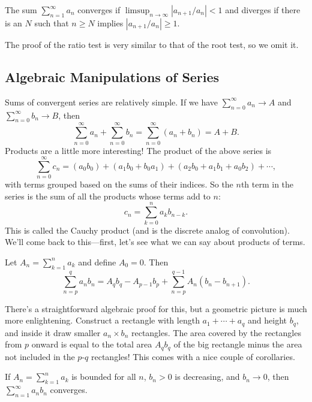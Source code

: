 \documentclass[../m131main.tex]{subfiles}
\begin{document}
\begin{theorem}
    The sum $\sum_{n=1}^{\infty} a_n$ converges if $\limsup_{n \to \infty} |a_{n+1} / a_n| < 1$ and diverges if there is an $N$ such that $n \geq N$ implies $|a_{n+1} / a_n| \geq 1$.
\end{theorem}

The proof of the ratio test is very similar to that of the root test, so we omit it.

\subsection*{Algebraic Manipulations of Series}
Sums of convergent series are relatively simple.
If we have $\sum_{n=0}^{\infty} a_n \to A$ and $\sum_{n=0}^{\infty} b_n \to B$, then
\[ \sum_{n=0}^{\infty} a_n + \sum_{n=0}^{\infty} b_n = \sum_{n=0}^{\infty} (a_n + b_n) = A + B. \]
Products are a little more interesting!
The product of the above series is
\[ \sum_{n=0}^{\infty} c_n = (a_0b_0) + (a_1b_0 + b_0a_1) + (a_2b_0 + a_1b_1 + a_0b_2) + \cdots, \]
with terms grouped based on the sums of their indices.
So the $n$th term in the series is the sum of all the products whose terms add to $n$:
\[ c_n = \sum_{k=0}^{n} a_k b_{n-k}. \]
This is called the Cauchy product (and is the discrete analog of convolution).
We'll come back to this---first, let's see what we can say about products of terms.

\begin{theorem}
    Let $A_n = \sum_{k=1}^{n} a_k$ and define $A_0 = 0$.
    Then
    \[ \sum_{n=p}^{q} a_n b_n = A_qb_q - A_{p-1}b_p + \sum_{n=p}^{q-1} A_n (b_n - b_{n+1}). \]
\end{theorem}

There's a straightforward algebraic proof for this, but a geometric picture is much more enlightening.
Construct a rectangle with length $a_1 + \cdots + a_q$ and height $b_q$, and inside it draw smaller $a_n \times b_n$ rectangles.
The area covered by the rectangles from $p$ onward is equal to the total area $A_q b_q$ of the big rectangle minus the area not included in the $p$-$q$ rectangles!
This comes with a nice couple of corollaries.

\begin{theorem}[]
    If $A_n = \sum_{k=1}^{n} a_k$ is bounded for all $n$, $b_n > 0$ is decreasing, and $b_n \to 0$, then $\sum_{n=1}^{\infty} a_n b_n$ converges.
\end{theorem}
\end{document}
